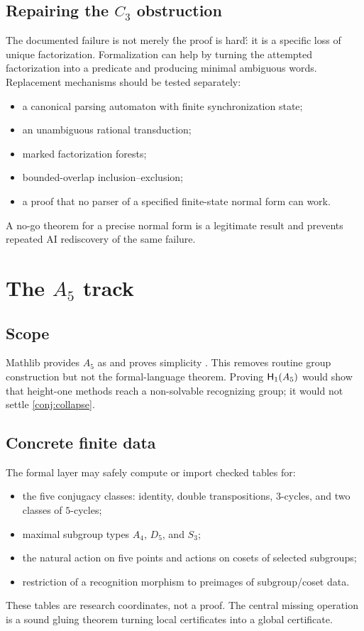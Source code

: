 \documentclass{amsart}
\begin{document}
\subsection{Repairing the $C_3$ obstruction}

The documented failure is not merely \'the proof is hard\': it is a specific loss of unique factorization.  Formalization can help by turning the attempted factorization into a predicate and producing minimal ambiguous words.  Replacement mechanisms should be tested separately:
\begin{itemize}
  \item a canonical parsing automaton with finite synchronization state;
  \item an unambiguous rational transduction;
  \item marked factorization forests;
  \item bounded-overlap inclusion--exclusion;
  \item a proof that no parser of a specified finite-state normal form can work.
\end{itemize}
A no-go theorem for a precise normal form is a legitimate result and prevents repeated AI rediscovery of the same failure.

\section{The $A_5$ track}

\subsection{Scope}

Mathlib provides $A_5$ as  and proves simplicity \cite{mathlibAlternating2026}.  This removes routine group construction but not the formal-language theorem.  Proving $\mathsf{H}_{1}(A_5)$ would show that height-one methods reach a non-solvable recognizing group; it would not settle \cref{conj:collapse}.

\subsection{Concrete finite data}

The formal layer may safely compute or import checked tables for:
\begin{itemize}
  \item the five conjugacy classes: identity, double transpositions, $3$-cycles, and two classes of $5$-cycles;
  \item maximal subgroup types $A_4$, $D_5$, and $S_3$;
  \item the natural action on five points and actions on cosets of selected subgroups;
  \item restriction of a recognition morphism to preimages of subgroup/coset data.
\end{itemize}
These tables are research coordinates, not a proof.  The central missing operation is a sound gluing theorem turning local certificates into a global certificate.
\end{document}
